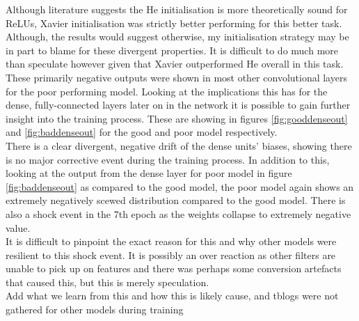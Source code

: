 \documentclass{article}
\begin{document}
Although literature suggests the He initialisation is more theoretically sound for ReLUs, Xavier initialisation was strictly better performing for this better task. Although, the results would suggest otherwise, my initialisation strategy may be in part to blame for these divergent properties. It is difficult to do much more than speculate however given that Xavier outperformed He overall in this task. \\

These primarily negative outputs were shown in most other convolutional layers for the poor performing model. Looking at the implications this has for the dense, fully-connected layers later on in the network it is possible to gain further insight into the training process. These are showing in figures \ref{fig:gooddenseout} and \ref{fig:baddenseout} for the good and poor model respectively. \\

There is a clear divergent, negative drift of the dense units' biases, showing there is no major corrective event during the training process. In addition to this, looking at the output from the dense layer for poor model in figure \ref{fig:baddenseout} as compared to the good model, the poor model again shows an extremely negatively scewed distribution compared to the good model. There is also a shock event in the 7th epoch as the weights collapse to extremely negative value.\\

It is difficult to pinpoint the exact reason for this and why other models were resilient to this shock event. It is possibly an over reaction as other filters are unable to pick up on features and there was perhaps some conversion artefacts that caused this, but this is merely speculation. \\

Add what we learn from this and how this is likely cause, and tblogs were not gathered for other models during training
\end{document}
